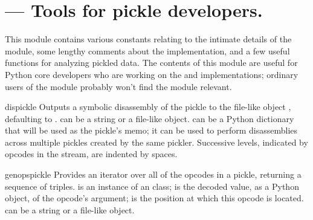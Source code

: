 \section{ --- Tools for pickle developers.}



This module contains various constants relating to the intimate
details of the  module, some lengthy comments about
the implementation, and a few useful functions for analyzing pickled
data.  The contents of this module are useful for Python core
developers who are working on the  and 
implementations; ordinary users of the  module probably
won't find the  module relevant.

\begin{funcdesc}{dis}{pickle}
Outputs a symbolic disassembly of the pickle to the file-like object
, defaulting to .   can be a
string or a file-like object.   can be a Python dictionary
that will be used as the pickle's memo; it can be used to perform
disassemblies across multiple pickles created by the same pickler.
Successive levels, indicated by  opcodes in the stream, are
indented by  spaces.
\end{funcdesc}

\begin{funcdesc}{genops}{pickle}
Provides an iterator over all of the opcodes in a pickle, returning a
sequence of  triples.
 is an instance of an  class;  
is the decoded value, as a Python object, of the opcode's argument; 
 is the position at which this opcode is located.
 can be a string or a file-like object.
\end{funcdesc}


